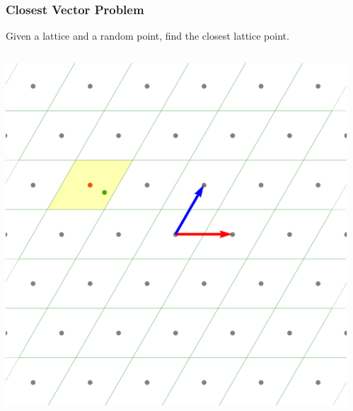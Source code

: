 \documentclass[
aspectratio=169, %
t, %
onlytextwidth, %
10pt, %
]{beamer}
\begin{document}

\begin{frame}
    \frametitle{Closest Vector Problem}
        \begin{tcolorbox}[colback=ICLBlue!5!white,colframe=ICLBlue,title=\textbf{Definition:} Closest Vector Problem (CVP)]
            Given a lattice and a random point, find the closest lattice point.
        \end{tcolorbox}

        \begin{columns}[T]
            \begin{column}{0.48\linewidth}
                \includegraphics[width=\linewidth]{cvp_good_basis.png}
            \end{column}
            \begin{column}{0.48\linewidth}

\end{column}
\end{columns}
\end{frame}
\end{document}

